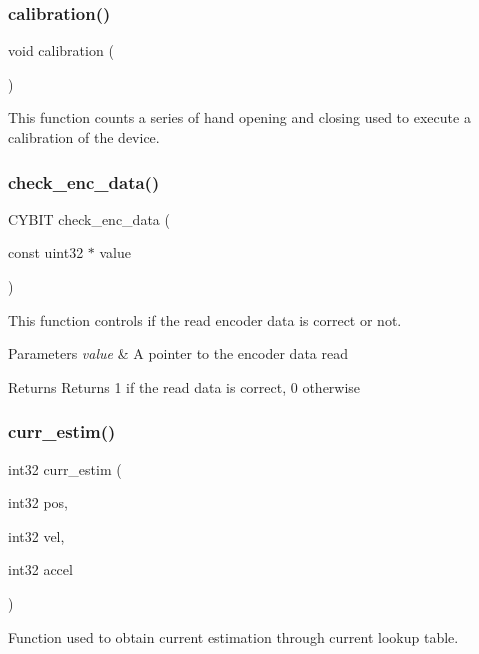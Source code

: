 \subsubsection{calibration()}
{\footnotesize\ttfamily void calibration (\begin{DoxyParamCaption}{ }\end{DoxyParamCaption})}

This function counts a series of hand opening and closing used to execute a calibration of the device. \mbox{\label{utils_8h_ae7faec5b3a1d000c90f70abfc1dfca92}} 
\subsubsection{check\+\_\+enc\+\_\+data()}
{\footnotesize\ttfamily C\+Y\+B\+IT check\+\_\+enc\+\_\+data (\begin{DoxyParamCaption}\item[{const uint32 $\ast$}]{value }\end{DoxyParamCaption})}

This function controls if the read encoder data is correct or not.


\begin{DoxyParams}{Parameters}
{\em value} & A pointer to the encoder data read\\
\hline
\end{DoxyParams}
\begin{DoxyReturn}{Returns}
Returns 1 if the read data is correct, 0 otherwise 
\end{DoxyReturn}
\mbox{\label{utils_8h_a26a940f426cb9610d30c90d8378a9bcf}} 
\subsubsection{curr\+\_\+estim()}
{\footnotesize\ttfamily int32 curr\+\_\+estim (\begin{DoxyParamCaption}\item[{int32}]{pos,  }\item[{int32}]{vel,  }\item[{int32}]{accel }\end{DoxyParamCaption})}

Function used to obtain current estimation through current lookup table.



